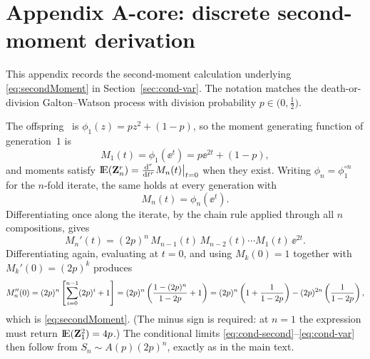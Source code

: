 \section{Appendix A-core: discrete second-moment derivation}
\label{app:a-core}

This appendix records the second-moment calculation underlying \eqref{eq:secondMoment} in Section~\ref{sec:cond-var}. The notation matches the death-or-division Galton--Watson process with division probability $p\in\bigl(0,\tfrac12\bigr)$.

The offspring \pgf\ is $\phi_1(z)=p z^2+(1-p)$, so the moment generating function of generation~$1$ is
\[
M_1(t)=\phi_1(\ee^t)=p\ee^{2t}+(1-p),
\]
and moments satisfy ${\rm I}\!{\rm E}({\bf Z}_n^r)=\frac{{\rm d}^r}{{\rm d} t^r}M_n(t)\big|_{t=0}$ when they exist. Writing $\phi_n=\phi_1^{\circ n}$ for the $n$-fold iterate, the same holds at every generation with
\[
M_n(t)=\phi_n(\ee^t).
\]
Differentiating once along the iterate, by the chain rule applied through all $n$ compositions, gives
\begin{equation}
\label{eq:app-dmgf2}
M_n'(t)
=
(2p)^n\,
M_{n-1}(t)\,
M_{n-2}(t)
\cdots
M_1(t)\,
\ee^{2t}.
\end{equation}
Differentiating again, evaluating at $t=0$, and using $M_k(0)=1$ together with $M_k'(0)=(2p)^k$ produces
\[
M_n''(0)
=
(2p)^n
\left[
\sum_{i=0}^{n-1}(2p)^i
+
1
\right]
=
(2p)^n\left(\frac{1-(2p)^n}{1-2p}+1\right)
=
(2p)^n\left(1+\frac{1}{1-2p}\right)
-
(2p)^{2n}\left(\frac{1}{1-2p}\right),
\]
which is \eqref{eq:secondMoment}. (The minus sign is required: at $n=1$ the expression must return ${\rm I}\!{\rm E}({\bf Z}_1^2)=4p$.) The conditional limits \eqref{eq:cond-second}--\eqref{eq:cond-var} then follow from $S_n\sim A(p)(2p)^n$, exactly as in the main text.
